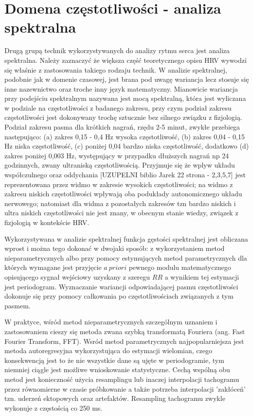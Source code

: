 \section{Domena częstotliwości - analiza spektralna}

Drugą grupą technik wykorzystywanych do analizy rytmu serca jest analiza
spektralna. Należy zaznaczyć że większa część teoretycznego opisu HRV wywodzi
się właśnie z zastosowania takiego rodzaju technik. 
W analizie spektralnej, podobnie jak w domenie czasowej, jest brana pod uwagę wariancja
lecz stosuje się inne nazewnictwo oraz troche inny język matematyczny.
Mianowicie wariancja przy podejściu spektralnym nazywana jest mocą spektralną, która jest 
wyliczana w podziale na częstotliwości z badanego zakresu, przy czym podział zakresu
częstotliwości jest dokonywany trochę sztucznie bez silnego związku z fizjologią. Podział
zakresu pasma dla krótkich nagrań, rzędu 2-5 minut, zwykłe przebiega następująco: (a) 
zakres 0,15 - 0,4 Hz wysoka częstotliwość, (b) zakres 0,04 - 0,15 Hz niska częstotliwość, (c)
poniżej 0,04 bardzo niska częstotliwość, dodatkowo (d) zakres poniżej 0,003 Hz,
występujący w przypadku dłuższych nagrań np 24 godzinnych, zwany ultraniską częstotliwością.
Przyjmuje się że wplyw układu współczulnego oraz oddychania [UZUPELNI biblio Jarek 22 strona - 2,3,5,7] jest reprezentowana przez widmo w zakresie wysokich częstotliwości; na widmo z
zakresu niskich częstotliwości wpływają oba podukłady autonomicznego układu nerwowego; 
natomiast dla widma z pozostałych zakresów tzn bardzo niskich i ultra niskich częstotliwości
nie jest znany, w obecnym stanie wiedzy, związek z fizjologią w kontekście HRV. 

Wykorzystywana w analizie spektralnej funkcja gęstości spektralnej jest obliczana wprost i
można tego dokonać w dwojaki sposób: z wykorzystaniem metod nieparametrycznych albo przy
pomocy estymujących metod parametrycznych dla których wymagane jest przyjęcie $a\:priori$
pewnego modulu matematycznego opisującego sygnał wejściowy uzyskany z szeregu $RR$ a
wynikiem tej estymacji jest periodogram. Wyznaczanie wariancji odpowiadającej pasmu
częstotliwości dokonuje się przy pomocy całkowania po częstotliwościach związanych z tym
pasmem. 

W praktyce, wśród metod nieparametrycznych szczególnym uznaniem i zastosowaniem cieszy się
metoda zwana szybką transformatą Fouriera (ang. Fast Fourier Transform, FFT). Wsród metod
parametrycznych najpopularniejsza jest metoda autoregresyjna wykorzystująca do estymacji
wielomian, czego konsekwencją jest to że nie wszystkie dane są ujęte w periodogramie, tym
niemniej ciągle jest możliwe wnioskowanie statystyczne. Cechą wspólną obu metod jest
konieczność użycia resamplingu lub inaczej interpolacji tachogramu przez równomierne w
czasie próbkowanie a także potrzeba interpolacji 'zakłóceń' tzn. uderzeń ektopowych oraz
artefaktów. Resampling tachogramu zwykle wykonuje z częstością co 250 ms.

